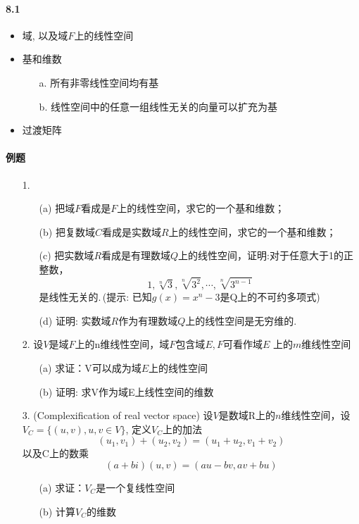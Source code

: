 \paragraph{8.1}
\begin{itemize}
    \item 域, 以及域$F$上的线性空间
    \item 基和维数
    \begin{itemize}
		\item[a.] 所有非零线性空间均有基
		\item[b.] 线性空间中的任意一组线性无关的向量可以扩充为基
	\end{itemize}
    \item 过渡矩阵
\end{itemize}

\paragraph{例题}
\begin{itemize}
  \item[1.]
  \begin{itemize}
    \item [(a)] 把域$F$看成是$F$上的线性空间，求它的一个基和维数；
    \item [(b)] 把复数域$C$看成是实数域$R$上的线性空间，求它的一个基和维数；
    \item [(c)] 把实数域$R$看成是有理数域$Q$上的线性空间，证明:对于任意大于1的正整数，
  $$1, \sqrt[n]{3}, \sqrt[n]{3^2}, \cdots, \sqrt[n]{3^{n-1}}$$
  是线性无关的.\,(提示: 已知$g(x) = x^n-3$是Q上的不可约多项式)
    \item [(d)] 证明: 实数域$R$作为有理数域$Q$上的线性空间是无穷维的.
\end{itemize}
\end{itemize}
\vspace{2cm}

\begin{itemize}
  \item[2.] 设$V$是域$F$上的n维线性空间，域$F$包含域$E$,\,$F$可看作域$E$
  上的$m$维线性空间
  \begin{itemize}
    \item [(a)] 求证：V可以成为域$E$上的线性空间
    \item [(b)] 证明: 求V作为域E上线性空间的维数
  \end{itemize}
\end{itemize}
\vspace{1.5cm}

\begin{itemize}
  \item[3.] (Complexification of real vector space)
  设$V$是数域R上的$n$维线性空间，设$V_C = \{(u,v), u,v\in V\}$,
  定义$V_C$上的加法
  $$(u_1,v_1) +(u_2, v_2) = (u_1+u_2, v_1+v_2)$$
  以及C上的数乘
  $$(a+bi)(u,v)=(au-bv, av+bu)$$
  \begin{itemize}
    \item [(a)] 求证：$V_C$是一个复线性空间
    \item [(b)] 计算$V_C$的维数
  \end{itemize}
\end{itemize}
\vspace{1cm}

